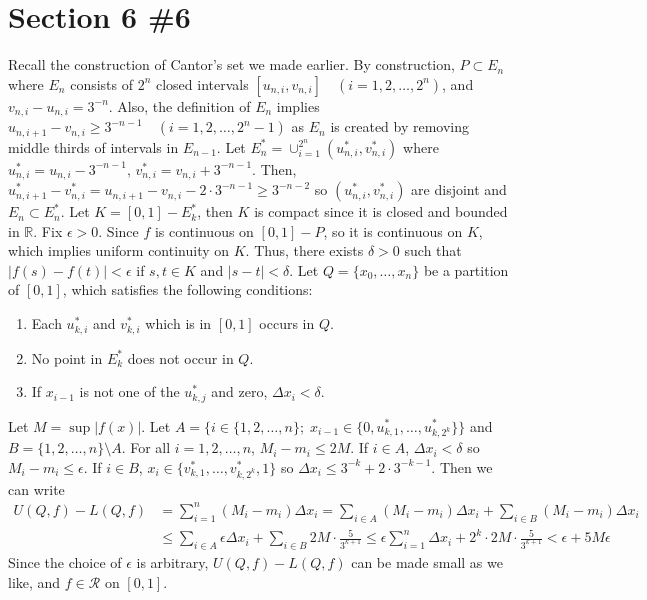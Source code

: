\documentclass{scrartcl}
\begin{document}
\section{Section 6 \#6}
Recall the construction of Cantor's set we made earlier.
By construction, \(P \subset E_n\) where \(E_n\) consists of \(2^n\) closed intervals \([u_{n, i}, v_{n, i}] \quad (i = 1, 2, \dots, 2^n)\), and \(v_{n, i} - u_{n, i} = 3^{-n}\).
Also, the definition of \(E_n\) implies \(u_{n, i + 1} - v_{n, i} \geq 3^{-n - 1} \quad (i = 1, 2, \dots, 2^n - 1)\) as \(E_n\) is created by removing middle thirds of intervals in \(E_{n - 1}\).
Let \(E^*_n = \cup^{2^n}_{i = 1} (u^*_{n, i}, v^*_{n, i})\) where \(u^*_{n, i} = u_{n, i} - 3^{-n - 1},\, v^*_{n, i} = v_{n, i} + 3^{-n - 1}\).
Then, \(u^*_{n, i + 1} - v^*_{n, i} = u_{n, i + 1} - v_{n, i} - 2 \cdot 3^{-n - 1} \geq 3^{-n - 2}\) so \((u^*_{n, i}, v^*_{n, i})\) are disjoint and \(E_n \subset E^*_n\).
Let \(K = [0, 1] - E^*_k\), then \(K\) is compact since it is closed and bounded in \(\mathbb{R}\).
Fix \(\epsilon > 0\).
Since \(f\) is continuous on \([0, 1] - P\), so it is continuous on \(K\), which implies uniform continuity on \(K\).
Thus, there exists \(\delta > 0\) such that \(|f(s) - f(t)| < \epsilon\) if \(s, t \in K\) and \(|s - t| < \delta\).
Let \(Q = \{x_0, \dots, x_n\}\) be a partition of \([0, 1]\), which satisfies the following conditions:
\begin{enumerate}
  \item Each \(u^*_{k, i}\) and \(v^*_{k, i}\) which is in \([0, 1]\) occurs in \(Q\).
  \item No point in \(E^*_k\) does not occur in \(Q\).
  \item If \(x_{i - 1}\) is not one of the \(u^*_{k, j}\) and zero, \(\Delta x_i < \delta\).
\end{enumerate}
Let \(M = \sup |f(x)|\).
Let \(A = \{i \in \{1, 2, \dots, n\};\; x_{i - 1} \in \{0, u^*_{k, 1}, \dots, u^*_{k, 2^k}\}\}\) and \(B = \{1, 2, \dots, n\} \setminus A\).
For all \(i = 1, 2, \dots, n\), \(M_i - m_i \leq 2M\).
If \(i \in A\), \(\Delta x_i < \delta\) so \(M_i - m_i \leq \epsilon\).
If \(i \in B\), \(x_i \in \{v^*_{k, 1}, \dots, v^*_{k, 2^k}, 1\}\) so \(\Delta x_i \leq 3^{-k} + 2 \cdot 3^{-k - 1}\).
Then we can write
\begin{align*}
  U(Q, f) - L(Q, f)
  &= \sum^n_{i = 1} (M_i - m_i) \Delta x_i
  = \sum_{i \in A} (M_i - m_i) \Delta x_i + \sum_{i \in B} (M_i - m_i) \Delta x_i \\
  &\leq \sum_{i \in A} \epsilon \Delta x_i + \sum_{i \in B} 2M \cdot \frac{5}{3^{k + 1}}
  \leq \epsilon \sum^n_{i = 1} \Delta x_i + 2^k \cdot 2M \cdot \frac{5}{3^{k + 1}}
  < \epsilon + 5M\epsilon
\end{align*}
Since the choice of \(\epsilon\) is arbitrary, \(U(Q, f) - L(Q, f)\) can be made small as we like, and \(f \in \mathscr{R}\) on \([0, 1]\).
\end{document}
